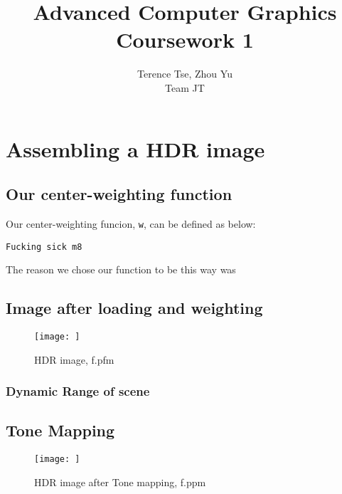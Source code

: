 \documentclass{article}
\begin{document}
\title{Advanced Computer Graphics\\ Coursework 1}
\author{Terence Tse, Zhou Yu \\ Team JT}
\maketitle
\newpage

\section{Assembling a HDR image}

\subsection{Our center-weighting function}
Our center-weighting funcion, \texttt{w}, can be defined as below:
\begin{verbatim}
Fucking sick m8
\end{verbatim}
The reason we chose our function to be this way was

\subsection{Image after loading and weighting}
\begin{center}
	\begin{figure}[H]
		\begin{center}
			\texttt{[image: ]}
			\caption{HDR image, f.pfm}
		\end{center}
	\end{figure}
\end{center}

\subsubsection{ Dynamic Range of scene} 

\subsection{Tone Mapping}
\begin{center}
	\begin{figure}[H]
		\begin{center}
			\texttt{[image: ]}
			\caption{HDR image after Tone mapping, f.ppm}
		\end{center}
	\end{figure}
\end{center}
\end{document}

